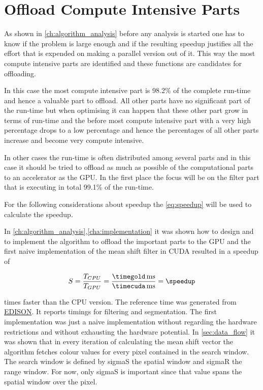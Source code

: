 \section{Offload Compute Intensive Parts}
\label{sec:offload_intensive}
\fpDiv{\speedup}{\timegold}{\timecuda}

As shown in \autoref{ch:algorithm_analysis} before any analysis is started one
has to know if the problem is large enough and if the resulting speedup
justifies all the effort that is expended on making a parallel version out of it.
This way the most compute intensive parts are identified and these functions
are candidates for offloading. 

In this case the most compute intensive part is 98.2\% of the complete run-time
and hence a valuable part to offload. All other parts have no significant part
of the run-time but when optimising it can happen that these other part grow in
terms of run-time and the before most compute intensive part with a very high
percentage drops to a low percentage and hence the percentages of all other
parts increase and become very compute intensive.

In other cases the run-time is often distributed among several parts and in this
case it should be tried to offload as much as possible of the computational parts
to an accelerator as the \gls{GPU}. In the first place the focus will be on the
filter part that is executing in total 99.1\% of the run-time.

For the following considerations about speedup the \autoref{eq:speedup} will be
used to calculate the speedup. 

In \autoref{ch:algorithm_analysis},\autoref{cha:implementation} it was shown how to design
and to implement the algorithm to offload the important parts to the \gls{GPU}
and the first naive implementation of the mean shift filter in \gls{CUDA}
resulted in a speedup of

\begin{equation*}\label{eq:speedup0}
	S = \frac{T_{CPU}}{T_{GPU}} = %
	\frac{\unit[\timegold]{ms}}{\unit[\timecuda]{ms}} = \speedup
\end{equation*}

times faster than the \gls{CPU} version. The reference time was generated from
\href{http://www.caip.rutgers.edu/riul/research/code.html}{ \gls{EDISON}}. It
reports timings for filtering and segmentation.
The first implementation was just a naive implementation without regarding the
hardware restrictions and without exhausting the hardware potential. In
\autoref{sec:data_flow} it was shown that in every iteration of calculating the
mean shift vector the algorithm fetches colour values for every pixel contained
in the search window. The search window is defined by \textsf{sigmaS} the
spatial window and \textsf{sigmaR} the range window. For now, only
\textsf{sigmaS} is important since that value spans the spatial window over
the pixel. 



